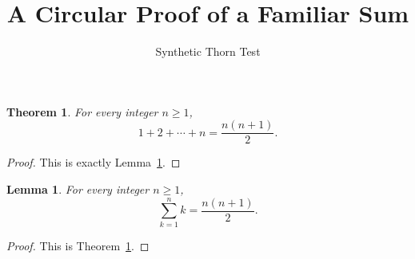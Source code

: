 \documentclass{article}
\newtheorem{theorem}{Theorem}
\newtheorem{lemma}{Lemma}
\begin{document}
\title{A Circular Proof of a Familiar Sum}
\author{Synthetic Thorn Test}
\maketitle

\begin{theorem}\label{thm:cycle-a}
For every integer $n\ge1$,
\[
1+2+\cdots+n=\frac{n(n+1)}2.
\]
\end{theorem}
\begin{proof}
This is exactly Lemma~\ref{lem:cycle-b}.
\end{proof}

\begin{lemma}\label{lem:cycle-b}
For every integer $n\ge1$,
\[
\sum_{k=1}^{n}k=\frac{n(n+1)}2.
\]
\end{lemma}
\begin{proof}
This is Theorem~\ref{thm:cycle-a}.
\end{proof}
\end{document}
